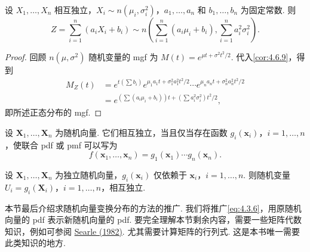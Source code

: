 \begin{corollary}\label{cor:4.6.10}
设 $X_1,\ldots,X_n$ 相互独立，$X_i\sim n(\mu_i,\sigma_i^2)$，$a_1,\ldots,a_n$ 和 $b_1,\ldots,b_n$ 为固定常数. 则
$$Z=\sum_{i=1}^n(a_iX_i+b_i)\sim n\left(\sum_{i=1}^n(a_i\mu_i+b_i),\sum_{i=1}^na_i^2\sigma_i^2\right).$$
\end{corollary}
\begin{proof}
回顾 $n(\mu,\sigma^2)$ 随机变量的 mgf 为 $M(t)=e^{\mu t+\sigma^2t^2/2}$. 代入\autoref{cor:4.6.9}，得到
$$\begin{aligned}
M_Z(t)&=e^{t(\sum b_i)}e^{\mu_1a_1t+\sigma_1^2a_1^2t^2/2}\cdots e^{\mu_na_nt+\sigma_n^2a_n^2t^2/2}\\
&=e^{(\sum(a_i\mu_i+b_i))t+(\sum a_i^2\sigma_i^2)t^2/2},
\end{aligned}$$
即所述正态分布的 mgf.
\end{proof}
\begin{theorem}\label{thm:4.6.11}
设 $\mathbf X_1,\ldots,\mathbf X_n$ 为随机向量. 它们相互独立，当且仅当存在函数 $g_i(\mathbf x_i)$，$i=1,\ldots,n$，使联合 pdf 或 pmf 可以写为
$$f(\mathbf x_1,\ldots,\mathbf x_n)=g_1(\mathbf x_1)\cdots g_n(\mathbf x_n).$$
\end{theorem}
\begin{theorem}\label{thm:4.6.12}
设 $\mathbf X_1,\ldots,\mathbf X_n$ 为独立随机向量，$g_i(\mathbf x_i)$ 仅依赖于 $\mathbf x_i$，$i=1,\ldots,n$. 则随机变量 $U_i=g_i(\mathbf X_i)$，$i=1,\ldots,n$，相互独立.
\end{theorem}
本节最后介绍求随机向量变换分布的方法的推广. 我们将推广\eqref{eq:4.3.6}，用原随机向量的 pdf 表示新随机向量的 pdf. 要完全理解本节剩余内容，需要一些矩阵代数知识，例如可参阅 \hyperref[bib:source283]{Searle (1982)}. 尤其需要计算矩阵的行列式. 这是本书唯一需要此类知识的地方.


